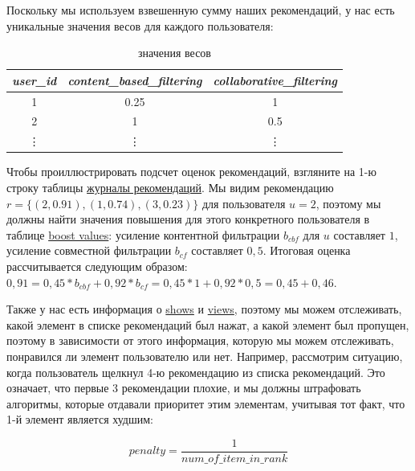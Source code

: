 \documentclass[14pt]{matmex-diploma-custom}
\begin{document}
  Поскольку мы используем взвешенную сумму наших рекомендаций, у нас есть уникальные значения весов для каждого пользователя:

    \begin{table}[h]
        \centering
        \begin{tabular}{ccc}
            \toprule
            \textit{user\_id} & \textit{content\_based\_filtering} & \textit{collaborative\_filtering} \\
            \midrule
            1                 & 0.25                                  & 1                               \\
            2                 & 1                               & 0.5                                \\
            \vdots & \vdots & \vdots \\
            \bottomrule
            \end{tabular}%
        \caption{значения весов}
        \label{tab:boost_values}
    \end{table}

Чтобы проиллюстрировать подсчет оценок рекомендаций, взгляните на 1-ю строку таблицы \hyperref [tab:advice_logs] {журналы рекомендаций}. Мы видим рекомендацию $ r = \{(2, 0.91), (1, 0.74), (3, 0.23) \} $ для пользователя $ u = 2 $, поэтому мы должны найти значения повышения для этого конкретного пользователя в таблице \hyperref [tab:boost_values] {boost values}: усиление контентной фильтрации $ b_{cbf} $ для $ u $ составляет $ 1 $, усиление совместной фильтрации $ b_{cf} $ составляет $ 0,5 $. Итоговая оценка рассчитывается следующим образом: $ 0,91 = 0,45 * b_{cbf} + 0,92 * b_{cf} = 0,45 * 1 + 0,92 * 0,5 = 0,45 + 0,46 $.

    Также у нас есть информация о \hyperref [tab:show] {shows} и \hyperref [tab:view] {views}, поэтому мы можем отслеживать, какой элемент в списке рекомендаций был нажат, а какой элемент был пропущен, поэтому в зависимости от этого информация, которую мы можем отслеживать, понравился ли элемент пользователю или нет. Например, рассмотрим ситуацию, когда пользователь щелкнул 4-ю рекомендацию из списка рекомендаций. Это означает, что первые 3 рекомендации плохие, и мы должны штрафовать алгоритмы, которые отдавали приоритет этим элементам, учитывая тот факт, что 1-й элемент является худшим:


\begin{equation}
    \textit{penalty} = \frac{1}{\textit{num\_of\_item\_in\_rank}}
\end{equation}
\end{document}

